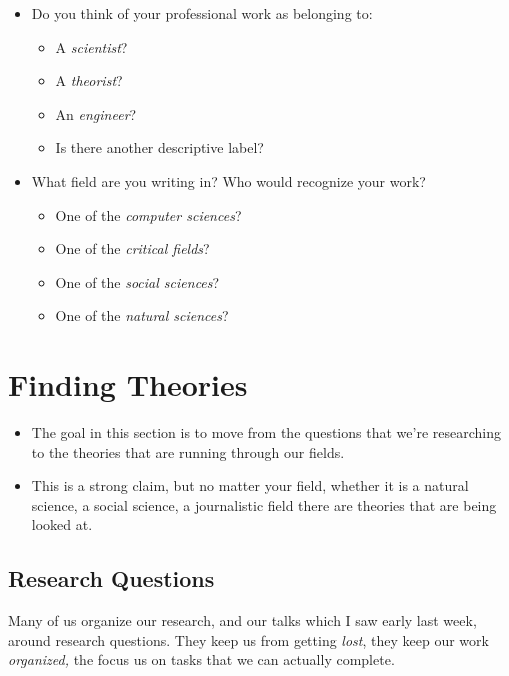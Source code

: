\documentclass[
  letterpaper,
  DIV=11,
  numbers=noendperiod]{scrreprt}
\providecommand{\tightlist}{%
  \setlength{\itemsep}{0pt}\setlength{\parskip}{0pt}}\usepackage{longtable,booktabs,array}
\begin{document}
\begin{itemize}
\tightlist
\item
  Do you think of your professional work as belonging to:

  \begin{itemize}
  \tightlist
  \item
    A \emph{scientist}?
  \item
    A \emph{theorist}?
  \item
    An \emph{engineer}?
  \item
    Is there another descriptive label?
  \end{itemize}
\item
  What field are you writing in? Who would recognize your work?

  \begin{itemize}
  \tightlist
  \item
    One of the \emph{computer sciences}?
  \item
    One of the \emph{critical fields}?
  \item
    One of the \emph{social sciences}?
  \item
    One of the \emph{natural sciences}?
  \end{itemize}
\end{itemize}


\chapter{Finding Theories}\label{finding-theories}

\begin{itemize}
\tightlist
\item
  The goal in this section is to move from the questions that we're
  researching to the theories that are running through our fields.
\item
  This is a strong claim, but no matter your field, whether it is a
  natural science, a social science, a journalistic field there are
  theories that are being looked at.
\end{itemize}

\section{Research Questions}\label{research-questions}

Many of us organize our research, and our talks which I saw early last
week, around research questions. They keep us from getting \emph{lost},
they keep our work \emph{organized,} the focus us on tasks that we can
actually complete.
\end{document}

